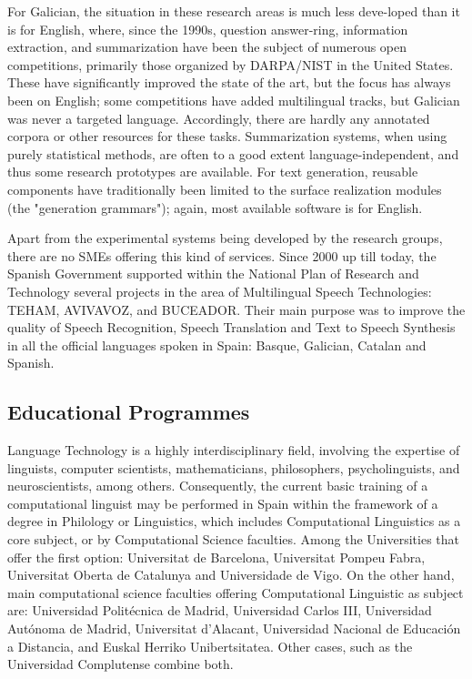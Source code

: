 \begin{multicols}{2}
\begin{itemize}
\begin{multicols}{2}

For Galician, the situation in these research areas is much less deve-loped than it is for English, where, since the 1990s, question answer-ring, information extraction, and summarization have been the subject of numerous open competitions, primarily those organized by DARPA/NIST in the United States. These have significantly improved the state of the art, but the focus has always been on English; some competitions have added multilingual tracks, but Galician was never a targeted language. Accordingly, there are hardly any annotated corpora or other resources for these tasks. Summarization systems, when using purely statistical methods, are often to a good extent language-independent, and thus some research prototypes are available. For text generation, reusable components have traditionally been limited to the surface realization modules (the "generation grammars"); again, most available software is for English. 

Apart from the experimental systems being developed by the research groups, there are no SMEs offering this kind of services. Since 2000 up till today, the Spanish Government supported within the National Plan of Research and Technology several projects in the area of Multilingual Speech Technologies: TEHAM, AVIVAVOZ, and BUCEADOR. Their main purpose was to improve the quality of Speech Recognition, Speech Translation and Text to Speech Synthesis in all the official languages spoken in Spain: Basque, Galician, Catalan and Spanish.


\subsection{Educational Programmes}

   Language Technology is a highly interdisciplinary field, involving the expertise of linguists, computer scientists, mathematicians, philosophers, psycholinguists, and neuroscientists, among others. Consequently, the current basic training of a computational linguist may be performed in Spain within the framework of a degree in Philology or Linguistics, which includes Computational Linguistics as a core subject, or by Computational Science faculties. Among the Universities that offer the first option: Universitat de Barcelona, Universitat Pompeu Fabra, Universitat Oberta de Catalunya and Universidade de Vigo. On the other hand, main computational science faculties offering Computational Linguistic as subject are: Universidad Politécnica de Madrid, Universidad Carlos III, Universidad Autónoma de Madrid, Universitat d’Alacant, Universidad Nacional de Educación a Distancia, and Euskal Herriko Unibertsitatea. Other cases, such as the Universidad Complutense combine both.


\end{multicols}
\end{itemize}
\end{multicols}
